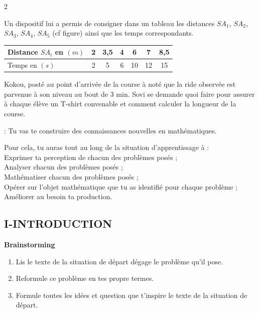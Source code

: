 \begin{multicols*}{2}
 
 	
 \par 	Un dispositif lui a permis de consigner dans un tableau les distances $ SA_1 $, $ SA_2 $, $ SA_3 $, $ SA_4 $, $ SA_5 $ (cf figure) ainsi que les temps correspondants.
 	
 	
 	\begin{tabular}{|p{2.5cm}|c|c|c|c|c|c|}
 		\hline 
 		Distance $ SA_i $ en $ (m) $	& 2 & 3,5 & 4 & 6 & 7 & 8,5 \\ 
 		\hline 
 		Temps en $ (s) $	& 2 & 5 & 6 &  10&12  & 15 \\ 
 		\hline 
 	\end{tabular} 
 	
 	\par Kokou, posté au point d'arrivée de la course à noté que la ride observée est parvenue à son niveau au  bout de 3 min.
 	Sovi se demande quoi faire pour assurer à chaque élève un T-shirt convenable et comment calculer la longueur de la course.	
 	
 	 : Tu vas te construire des connaissances nouvelles en mathématiques.
 	
 	Pour cela, tu auras tout au long de la situation d’apprentissage à :\\ 
 	 Exprimer ta perception de chacun des problèmes posés ;\\ 
 	 Analyser chacun des problèmes posés ; \\
 	 Mathématiser chacun des problèmes posés ; \\
 	 Opérer sur l’objet mathématique que tu as identifié pour chaque problème ; \\
 	 Améliorer au besoin ta production.\\
 	
 	\vspace*{-1cm}
 	\begin{center}
 		\section*{I-INTRODUCTION}
 	\end{center}  
 	 \textbf{ Brainstorming}\\
 	\begin{enumerate}
 		\item Lis le texte de la situation de départ dégage le problème qu'il pose.
 		\item Reformule ce problème en tes propre termes.
 		\item Formule toutes les idées et question que t'inspire le texte de la situation de départ.
 	\end{enumerate}
 	

\end{multicols*}
